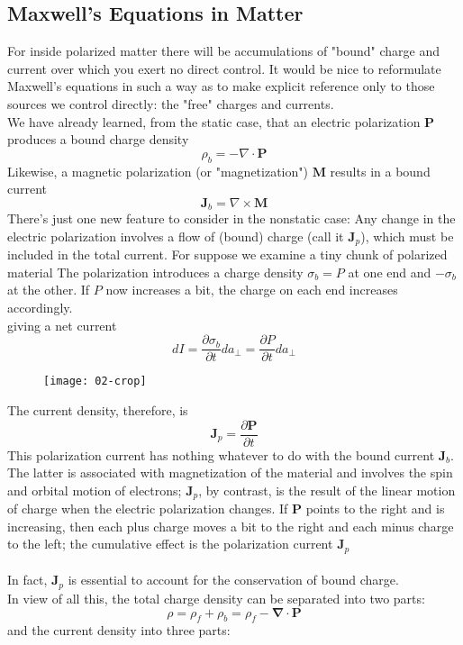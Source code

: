 \subsection{Maxwell's Equations in Matter}
For inside polarized matter there will be accumulations of "bound" charge and current over which you exert no direct control. It would be nice to reformulate Maxwell's equations in such a way as to make explicit reference only to those sources we control directly: the "free" charges and currents. \\
We have already learned, from the static case, that an electric polarization $\mathbf{P}$ produces a bound charge density $$\rho_{b}=-\nabla \cdot \mathbf{P}$$ Likewise, a magnetic polarization (or "magnetization") $\mathbf{M}$ results in a bound current $$\mathbf{J}_{b}=\nabla \times \mathbf{\mathbf { M }}$$ There's just one new feature to consider in the nonstatic case: Any change in the electric polarization involves a flow of (bound) charge (call it $\mathbf{J}_{p}$), which must be included in the total current. For suppose we examine a tiny chunk of polarized material The polarization introduces a charge density $\sigma_{b}=P$ at one end and $-\sigma_{b}$ at the other. If $P$ now increases a bit, the charge on each end increases accordingly. \\giving a net current $$d I=\frac{\partial \sigma_{b}}{\partial t} d a_{\perp}=\frac{\partial P}{\partial t} d a_{\perp}$$
\begin{figure}[H]
	\begin{center}
		\texttt{[image: 02-crop]}
	\end{center}
\end{figure}
The current density, therefore, is $$\mathbf{J}_{p}=\frac{\partial \mathbf{P}}{\partial t}$$
This polarization current has nothing whatever to do with the bound current $\mathbf{J}_{b}$. The latter is associated with magnetization of the material and involves the spin and orbital motion of electrons; $\mathbf{J}_{p}$, by contrast, is the result of the linear motion of charge when the electric polarization changes. If $\mathbf{P}$ points to the right and is increasing, then each plus charge moves a bit to the right and each minus charge to the left; the cumulative effect is the polarization current $\mathbf{J}_{p}$\\\\
In fact, $\mathbf{J}_{p}$ is essential to account for the conservation of bound charge.\\
In view of all this, the total charge density can be separated into two parts: $$\rho=\rho_{f}+\rho_{b}=\rho_{f}-\boldsymbol{\nabla} \cdot \mathbf{P}$$ and the current density into three parts:
